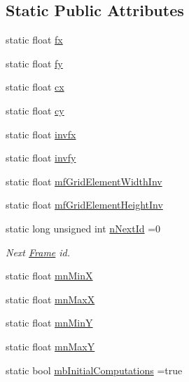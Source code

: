 \subsection*{Static Public Attributes}
\begin{DoxyCompactItemize}
\item 
static float \mbox{\hyperlink{class_o_r_b___s_l_a_m2_1_1_frame_ab505e3f86afa1c3d16b98fda89ec394c}{fx}}
\item 
static float \mbox{\hyperlink{class_o_r_b___s_l_a_m2_1_1_frame_a226a0adc90bc7a09502fc4db00ee20d7}{fy}}
\item 
static float \mbox{\hyperlink{class_o_r_b___s_l_a_m2_1_1_frame_a5f2803f215bc30016bd0833d8c7d5942}{cx}}
\item 
static float \mbox{\hyperlink{class_o_r_b___s_l_a_m2_1_1_frame_abf6a631b787270da2d5b3c0f53615b62}{cy}}
\item 
static float \mbox{\hyperlink{class_o_r_b___s_l_a_m2_1_1_frame_a617c29a929afd74d599c9e41fc71abea}{invfx}}
\item 
static float \mbox{\hyperlink{class_o_r_b___s_l_a_m2_1_1_frame_ad1dfdeb6378b11477c1b94233f881345}{invfy}}
\item 
static float \mbox{\hyperlink{class_o_r_b___s_l_a_m2_1_1_frame_afc2f7799428918dbbf46f7dfc4ccd59d}{mf\+Grid\+Element\+Width\+Inv}}
\item 
static float \mbox{\hyperlink{class_o_r_b___s_l_a_m2_1_1_frame_a010327bee872485894b5905d17462086}{mf\+Grid\+Element\+Height\+Inv}}
\item 
static long unsigned int \mbox{\hyperlink{class_o_r_b___s_l_a_m2_1_1_frame_a1ea8a00151931d155747283850467733}{n\+Next\+Id}} =0
\begin{DoxyCompactList}\small\item\em Next \mbox{\hyperlink{class_o_r_b___s_l_a_m2_1_1_frame}{Frame}} id. \end{DoxyCompactList}\item 
static float \mbox{\hyperlink{class_o_r_b___s_l_a_m2_1_1_frame_ac119d458dd562196240e72b7dbb54f3d}{mn\+MinX}}
\item 
static float \mbox{\hyperlink{class_o_r_b___s_l_a_m2_1_1_frame_ade32bf37203ae9578e4bd9a02cc0f7c1}{mn\+MaxX}}
\item 
static float \mbox{\hyperlink{class_o_r_b___s_l_a_m2_1_1_frame_a38d30251e5bf5e44411e83b688dfac97}{mn\+MinY}}
\item 
static float \mbox{\hyperlink{class_o_r_b___s_l_a_m2_1_1_frame_ac63dd82413eba002462109e625207ab4}{mn\+MaxY}}
\item 
static bool \mbox{\hyperlink{class_o_r_b___s_l_a_m2_1_1_frame_a9f57238f88850695d8cf032b5af0dad6}{mb\+Initial\+Computations}} =true
\end{DoxyCompactItemize}

